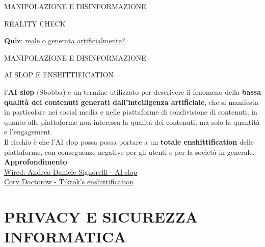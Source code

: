 \documentclass[aspectratio=1610]{beamer}
\begin{document}
\begin{frame}{MANIPOLAZIONE E DISINFORMAZIONE}
    \begin{alertblock}{REALITY CHECK}
        \begin{minipage}{0.96\linewidth}
            \justifying
            \textbf{Quiz}: \textcolor{red}{\href{https://realitycheckk.com/}{reale o generata artificialmente?}}
        \end{minipage}
    \end{alertblock}
\end{frame}

\begin{frame}{MANIPOLAZIONE E DISINFORMAZIONE}
    \begin{alertblock}{AI SLOP E ENSHITTIFICATION}
        \begin{minipage}{0.96\linewidth}
            \justifying
            l'\textbf{AI slop} (Sbobba) è un termine utilizzato per descrivere il fenomeno della 
            \textbf{bassa qualità dei contenuti generati dall'intelligenza artificiale}, che si manifesta 
            in particolare nei social media e nelle piattaforme di condivisione di contenuti, in quanto 
            alle piattaforme non interessa la qualità dei contenuti, ma solo la quantità e l'engagement.\\
            Il rischio è che l'AI slop possa possa portare a un \textbf{totale enshittification} delle 
            piattaforme, con conseguenze negative per gli utenti e per la società in generale.\\
            \bigskip
            \tiny{\textbf{Approfondimento}}\\
            \tiny{\href{https://www.wired.it/article/ai-slop-definizione-sbobba-infinita-bassa-qualita/}{Wired: Andrea Daniele Signorelli - AI slop}}\\
            \tiny{\href{https://pluralistic.net/2023/01/21/potemkin-ai/\#hey-guys}{Cory Doctorow - Tiktok's enshittification}}
        \end{minipage}
    \end{alertblock}
\end{frame}

\section{PRIVACY E SICUREZZA INFORMATICA}
\end{document}
